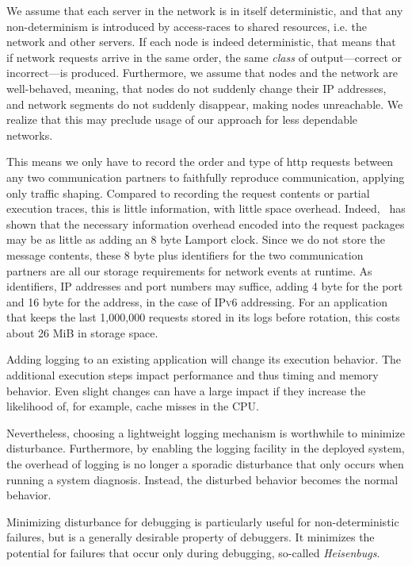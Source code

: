 We assume that each server in the network is in itself deterministic,
and that any non-determinism is introduced by access-races to shared
resources, i.e. the network and other servers. If each node is indeed
deterministic, that means that if network requests arrive in the same
order, the same \emph{class} of output---correct or incorrect---is
produced. Furthermore, we assume that nodes and the network are
well-behaved, meaning, that nodes do not suddenly change their
\textsc{IP} addresses, and network segments do not suddenly disappear,
making nodes unreachable. We realize that this may preclude usage of
our approach for less dependable networks.

This means we only have to record the order and type of \ac{http}
requests between any two communication partners to faithfully
reproduce communication, applying only traffic shaping. Compared to
recording the request contents or partial execution traces, this is
little information, with little space
overhead. Indeed,~\cite{Geels2006Replay} has shown that the necessary
information overhead encoded into the request packages may be as
little as adding an 8 byte Lamport clock. Since we do not store the
message contents, these 8 byte plus identifiers for the two
communication partners are all our storage requirements for network
events at runtime. As identifiers, \textsc{IP} addresses and port
numbers may suffice, adding 4 byte for the port and 16 byte for the
address, in the case of \textsc{IPv6} addressing. For an application
that keeps the last 1,000,000 requests stored in its logs before
rotation, this costs about 26 MiB in storage space.

Adding logging to an existing application will change its execution
behavior. The additional execution steps impact performance and thus
timing and memory behavior. Even slight changes can have a large
impact if they increase the likelihood of, for example, cache misses
in the \textsc{CPU}.

Nevertheless, choosing a lightweight logging mechanism is worthwhile
to minimize disturbance. Furthermore, by enabling the logging facility
in the deployed system, the overhead of logging is no longer a
sporadic disturbance that only occurs when running a system
diagnosis. Instead, the disturbed behavior becomes the normal
behavior.

Minimizing disturbance for debugging is particularly useful for
non-deterministic failures, but is a generally desirable property of
debuggers. It minimizes the potential for failures that occur only
during debugging, so-called \emph{Heisenbugs}.


